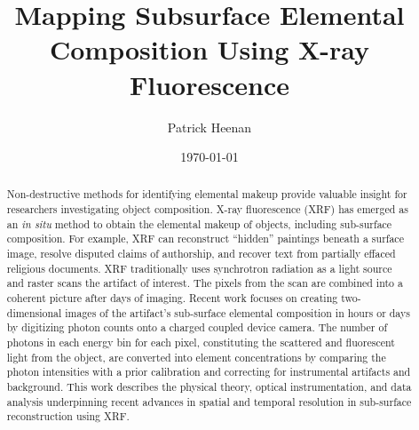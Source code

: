 \documentclass[%
  aip,12pt,tightenlines,
  amsthm,
 amsmath,amssymb,
 reprint,%
]{revtex4-1}
\newcommand{\firstp}[0]{\noindent}
\begin{document}

\singlespacing

\title[CU Boulder, Comps II, 2017]{Mapping Subsurface Elemental Composition Using X-ray Fluorescence}%

\author{Patrick Heenan }
%

\date{\today}%



\newpage


\begin{abstract}

\firstp Non-destructive methods for identifying elemental makeup provide valuable insight for researchers investigating object composition. X-ray fluorescence (XRF) has emerged as an \emph{in situ} method to obtain the elemental makeup of objects, including sub-surface composition. For example, XRF can reconstruct “hidden” paintings beneath a surface image, resolve disputed claims of authorship, and recover text from partially effaced religious documents. XRF traditionally uses synchrotron radiation as a light source and raster scans the artifact of interest. The pixels from the scan are combined into a coherent picture after days of imaging. Recent work focuses on creating two-dimensional images of the artifact's sub-surface elemental composition in hours or days by digitizing photon counts onto a charged coupled device camera. The number of photons in each energy bin for each pixel, constituting the scattered and fluorescent light from the object, are converted into element concentrations by comparing the photon intensities with a prior calibration and correcting for instrumental artifacts and background. This work describes the physical theory, optical instrumentation, and data analysis underpinning recent advances in spatial and temporal resolution in sub-surface reconstruction using XRF. 
\end{abstract}




\maketitle
\end{document}
